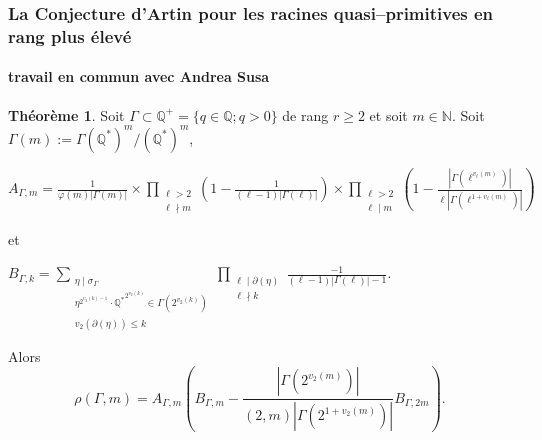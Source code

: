 \documentclass[10pt,handout]{beamer} %
\newcommand{\Q}{\mathbb Q}
\newcommand{\N}{\mathbb N}
\theoremstyle{definition}
\newtheorem{theoreme}[theorem]{{Th\'eor\`eme}}
\begin{document}
 \begin{frame}
 \frametitle{La Conjecture d'Artin pour les racines quasi--primitives en rang plus \'elev\'e}
\framesubtitle{travail en commun avec Andrea Susa}


\begin{theoreme}
 Soit $\Gamma \subset \Q^+=\{q\in\Q; q>0\}$ de rang $r\ge2$ et soit $m\in\N$. Soit $\Gamma(m):=\Gamma(\Q^*)^m/(\Q^*)^m$,\medskip

{\scriptsize{
 \centerline{$\displaystyle{A_{\Gamma,m}=\frac1{\varphi(m)|\Gamma(m)|}\times
\prod_{\substack{\ell>2\\ \ell\nmid
m}}\left(1-\frac1{(\ell-1)|\Gamma(\ell)|}\right)
\times\prod_{\substack{\ell>2\\ \ell\mid
m}}\left(1-\frac{|\Gamma(\ell^{v_\ell(m)})|}{\ell|\Gamma(\ell^{1+v_\ell(m)})|}\right)
}$}}}\medskip

et \medskip

{\scriptsize{
 \centerline{$\displaystyle{ B_{\Gamma,k} =\sum_{\substack{
\eta\mid\sigma_\Gamma\\
 \eta^{2^{v_2(k)-1}}\!\!\!\cdot{\Q^*}^{2^{v_2(k)}}\in\Gamma(2^{v_2(k)})\\ 
v_2(\partial(\eta))\le k}}\prod_{\substack{\ell\mid \partial(\eta)\\
\ell\nmid k}}\frac{-1}{(\ell-1)|\Gamma(\ell)|-1}.
}$}}}

Alors
$$\rho(\Gamma,m) = A_{\Gamma,m}\left( B_{\Gamma,m}
-\frac{|\Gamma(2^{v_{2}(m)})|}{(2,m)|\Gamma(2^{1+v_{2}(m)})|} B_{\Gamma,2m}\right).$$
\end{theoreme}
\end{frame}
 
\end{document}
